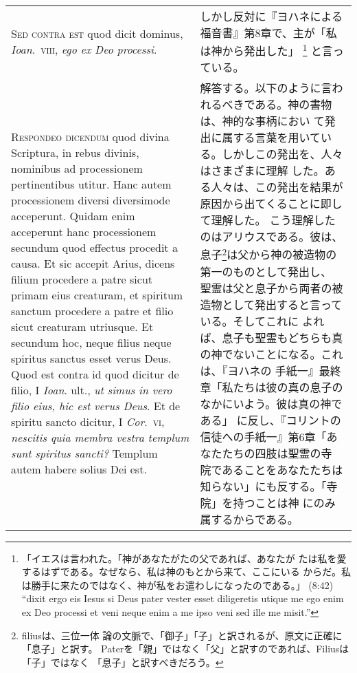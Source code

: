 \documentclass[10pt]{jsarticle} %
\begin{document}
\begin{longtable}{p{21em}p{21em}}
{\scshape Sed contra est} quod dicit dominus, {\itshape Ioan}.~{\scshape viii}, {\itshape ego ex Deo processi}.


&

しかし反対に『ヨハネによる福音書』第8章で、主が「私は神から発出した」
 \footnote{「イエスは言われた。「神があなたがたの父であれば、あなたが
 たは私を愛するはずである。なぜなら、私は神のもとから来て、ここにいる
 からだ。私は勝手に来たのではなく、神が私をお遣わしになったのである。」
 (8:42) ``dixit ergo eis Iesus si Deus pater vester esset diligeretis
 utique me ego enim ex Deo processi et veni neque enim a me ipso veni
 sed ille me misit.''} と言っている。


\\



{\scshape Respondeo dicendum} quod divina Scriptura, in rebus divinis, nominibus ad
processionem pertinentibus utitur. Hanc autem processionem diversi
diversimode acceperunt. Quidam enim acceperunt hanc processionem
secundum quod effectus procedit a causa. Et sic accepit Arius, dicens
filium procedere a patre sicut primam eius creaturam, et spiritum
sanctum procedere a patre et filio sicut creaturam utriusque. Et
secundum hoc, neque filius neque spiritus sanctus esset verus Deus. Quod
est contra id quod dicitur de filio, I {\itshape Ioan}. ult., {\itshape ut simus in vero
filio eius, hic est verus Deus}. Et de spiritu sancto dicitur, I {\itshape Cor}.~{\scshape vi},
{\itshape nescitis quia membra vestra templum sunt spiritus sancti?} Templum autem
habere solius Dei est. 



&

解答する。以下のように言われるべきである。神の書物は、神的な事柄におい
て発出に属する言葉を用いている。しかしこの発出を、人々はさまざまに理解
した。ある人々は、この発出を結果が原因から出てくることに即して理解した。
こう理解したのはアリウスである。彼は、息子\footnote{filiusは、三位一体
論の文脈で、「御子」「子」と訳されるが、原文に正確に「息子」と訳す。
Paterを「親」ではなく「父」と訳すのであれば、Filiusは「子」ではなく
「息子」と訳すべきだろう。}は父から神の被造物の第一のものとして発出し、
聖霊は父と息子から両者の被造物として発出すると言っている。そしてこれに
よれば、息子も聖霊もどちらも真の神でないことになる。これは、『ヨハネの
手紙一』最終章「私たちは彼の真の息子のなかにいよう。彼は真の神である」
に反し、『コリントの信徒への手紙一』第6章「あなたたちの四肢は聖霊の寺
院であることをあなたたちは知らない」にも反する。「寺院」を持つことは神
にのみ属するからである。



\end{longtable}
\end{document}
